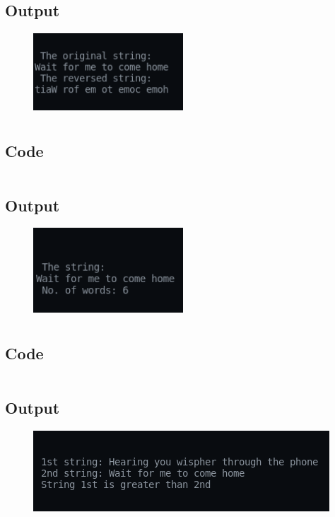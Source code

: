 \documentclass[12pt]{article}
\begin{document}
\subsection{Output}
\begin{figure}[h]
    \centering
    \includegraphics[width=0.5\textwidth]{9.png}
\end{figure}
\newpage
\section{}
\subsection{Code}
\inputminted{c}{q10.c}
\subsection{Output}
\begin{figure}[h]
    \centering
    \includegraphics[width=0.5\textwidth]{ 10.png}
\end{figure}
\newpage
\section{}
\subsection{Code}
\inputminted{c}{q11.c}
\subsection{Output}
\begin{figure}[h]
    \centering
    \includegraphics{11.png}
\end{figure}
\end{document}
